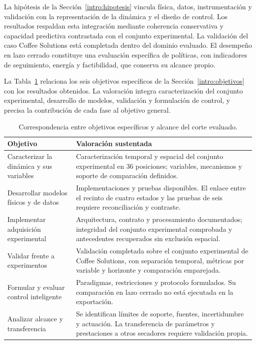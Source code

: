 La hipótesis de la Sección~\ref{intro:hipotesis} vincula física, datos, instrumentación y validación con la representación de la dinámica y el diseño de control. Los resultados respaldan esta integración mediante coherencia conservativa y capacidad predictiva contrastada con el conjunto experimental. La validación del caso Coffee Solutions está completada dentro del dominio evaluado. El desempeño en lazo cerrado constituye una evaluación específica de políticas, con indicadores de seguimiento, energía y factibilidad, que conserva su alcance propio.

La Tabla~\ref{tab:dis_objetivos} relaciona los seis objetivos específicos de la Sección~\ref{intro:objetivos} con los resultados obtenidos. La valoración integra caracterización del conjunto experimental, desarrollo de modelos, validación y formulación de control, y precisa la contribución de cada fase al objetivo general.

\begin{table}[htbp]
\centering
\small
\caption{Correspondencia entre objetivos específicos y alcance del corte evaluado.}
\label{tab:dis_objetivos}
\begingroup
\renewcommand{\arraystretch}{1.25}
\setlength{\tabcolsep}{4pt}
\begin{tabularx}{\textwidth}{>{\raggedright\arraybackslash}p{}>{\raggedright\arraybackslash}X}
\toprule
Objetivo & Valoración sustentada \\
\midrule
Caracterizar la dinámica y sus variables & Caracterización temporal y espacial del conjunto experimental en $36$ posiciones; variables, mecanismos y soporte de comparación definidos. \\
Desarrollar modelos físicos y de datos & Implementaciones y pruebas disponibles. El enlace entre el recinto de cuatro estados y las pruebas de seis requiere reconciliación y contraste. \\
Implementar adquisición experimental & Arquitectura, contrato y procesamiento documentados; integridad del conjunto experimental comprobada y antecedentes recuperados sin exclusión espacial. \\
Validar frente a experimentos & Validación completada sobre el conjunto experimental de Coffee Solutions, con separación temporal, métricas por variable y horizonte y comparación emparejada. \\
Formular y evaluar control inteligente & Paradigmas, restricciones y protocolo formulados. Su comparación en lazo cerrado no está ejecutada en la exportación. \\
Analizar alcance y transferencia & Se identifican límites de soporte, fuentes, incertidumbre y actuación. La transferencia de parámetros y prestaciones a otros secadores requiere validación propia. \\
\bottomrule
\end{tabularx}
\endgroup
\end{table}

